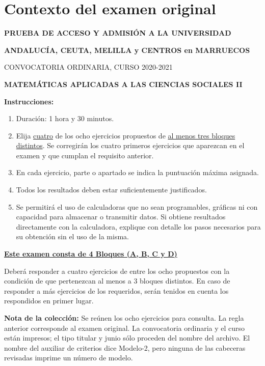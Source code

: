 \section*{Contexto del examen original}
\textbf{PRUEBA DE ACCESO Y ADMISIÓN A LA UNIVERSIDAD}\par
\textbf{ANDALUCÍA, CEUTA, MELILLA y CENTROS en MARRUECOS}\par
CONVOCATORIA ORDINARIA, CURSO 2020-2021\par
\textbf{MATEMÁTICAS APLICADAS A LAS CIENCIAS SOCIALES II}

\textbf{Instrucciones:}
\begin{enumerate}[label=\textbf{\alph*)}]
  \item Duración: 1 hora y 30 minutos.
  \item Elija \underline{cuatro} de los ocho ejercicios propuestos de
  \underline{al menos tres bloques distintos}. Se corregirán los cuatro
  primeros ejercicios que aparezcan en el examen y que cumplan el requisito
  anterior.
  \item En cada ejercicio, parte o apartado se indica la puntuación máxima
  asignada.
  \item Todos los resultados deben estar suficientemente justificados.
  \item Se permitirá el uso de calculadoras que no sean programables,
  gráficas ni con capacidad para almacenar o transmitir datos. Si obtiene
  resultados directamente con la calculadora, explique con detalle los pasos
  necesarios para su obtención sin el uso de la misma.
\end{enumerate}
\textbf{\underline{Este examen consta de 4 Bloques (A, B, C y D)}}\par
Deberá responder a cuatro ejercicios de entre los ocho propuestos con la
condición de que pertenezcan al menos a 3 bloques distintos. En caso de
responder a más ejercicios de los requeridos, serán tenidos en cuenta los
respondidos en primer lugar.

\noindent\textbf{Nota de la colección:} Se reúnen los ocho ejercicios para
consulta. La regla anterior corresponde al examen original. La convocatoria
ordinaria y el curso están impresos; el tipo titular y junio sólo proceden
del nombre del archivo. El nombre del auxiliar de criterios dice Modelo-2,
pero ninguna de las cabeceras revisadas imprime un número de modelo.
\par\medskip
